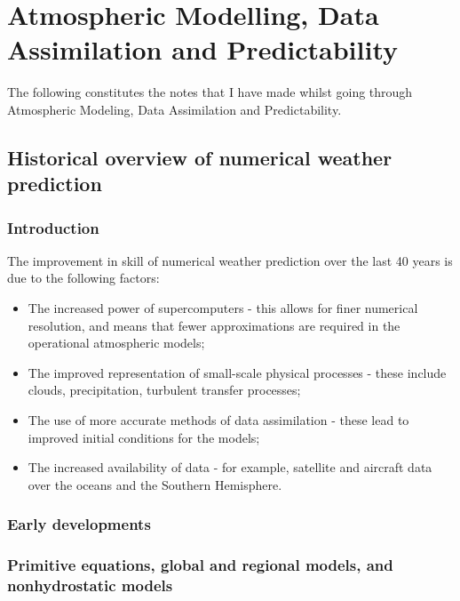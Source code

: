 \chapter{Atmospheric Modelling, Data Assimilation and Predictability}
\label{ch:kalnay}

The following constitutes the notes that I have made whilst going through Atmospheric Modeling, Data Assimilation and Predictability\citep{kalnay_atmospheric_2003}.

\section{Historical overview of numerical weather prediction}
\label{sec:kalnay:historical_overview}

\subsection{Introduction}
\label{sub:historical_overview:introduction}

The improvement in skill of numerical weather prediction over the last 40 years is due to the following factors:
\begin{itemize}
\item The increased power of supercomputers - this allows for finer numerical resolution, and means that fewer approximations are required in the operational atmospheric models;
\item The improved representation of small-scale physical processes - these include clouds, precipitation, turbulent transfer processes;
\item The use of more accurate methods of data assimilation - these lead to improved initial conditions for the models;
\item The increased availability of data - for example, satellite and aircraft data over the oceans and the Southern Hemisphere. 
\end{itemize}

\subsection{Early developments}
\label{sub:historical_overview:early_developments}

\subsection{Primitive equations, global and regional models, and nonhydrostatic models}
\label{sub:historical_overview:primitive_equations}


